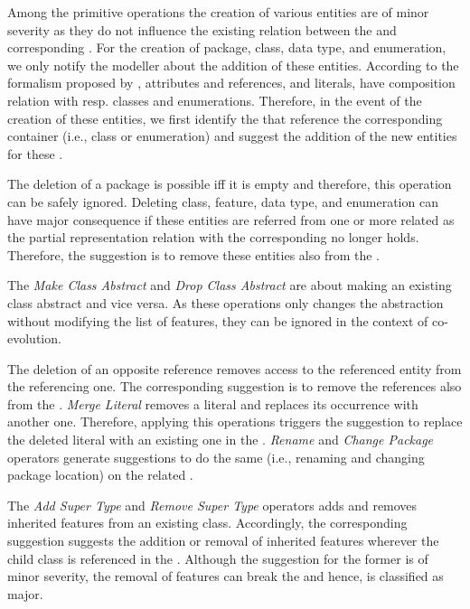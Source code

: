 Among the primitive operations the creation of various entities are of minor severity as they do not influence the existing relation between the \metamodel and corresponding \viewtypes. For the creation of package, class, data type, and enumeration, we only notify the modeller about the addition of these entities. 
According to the \metamodeling formalism proposed by \cite{herrmannsdoerfer_extensive_2011}, attributes and references, and literals, have composition relation with resp. classes and enumerations. Therefore, in the event of the creation of these entities, we first identify the \viewtypes that reference the corresponding container (i.e., class or enumeration) and suggest the addition of the new entities for these \viewtypes.

The deletion of a package is possible iff it is empty and therefore, this operation can be safely ignored. Deleting class, feature, data type, and enumeration can have major consequence if these entities are referred from one or more related \viewtypes as the partial representation relation with the corresponding \metamodel no longer holds. Therefore, the suggestion is to remove these entities also from the \viewtypes.

The \textit{Make Class Abstract} and \textit{Drop Class Abstract} are about making an existing class abstract and vice versa. As these operations only changes the abstraction without modifying the list of features, they can be ignored in the context of \viewtype co-evolution. 

The deletion of an opposite reference removes access to the referenced entity from the referencing one. The corresponding suggestion is to remove the references also from the \viewtype. \textit{Merge Literal} removes a literal and replaces its occurrence with another one. Therefore, applying this operations triggers the suggestion to replace the deleted literal with an existing one in the \viewtype. \textit{Rename} and \textit{Change Package} operators generate suggestions to do the same (i.e., renaming and changing package location) on the related \viewtypes.

The \textit{Add Super Type} and \textit{Remove Super Type} operators adds and removes inherited features from an existing class. Accordingly, the corresponding suggestion suggests the addition or removal of inherited features wherever the child class is referenced in the \viewtype. Although the suggestion for the former is of minor severity, the removal of features can break the \viewtype and hence, is classified as major.

